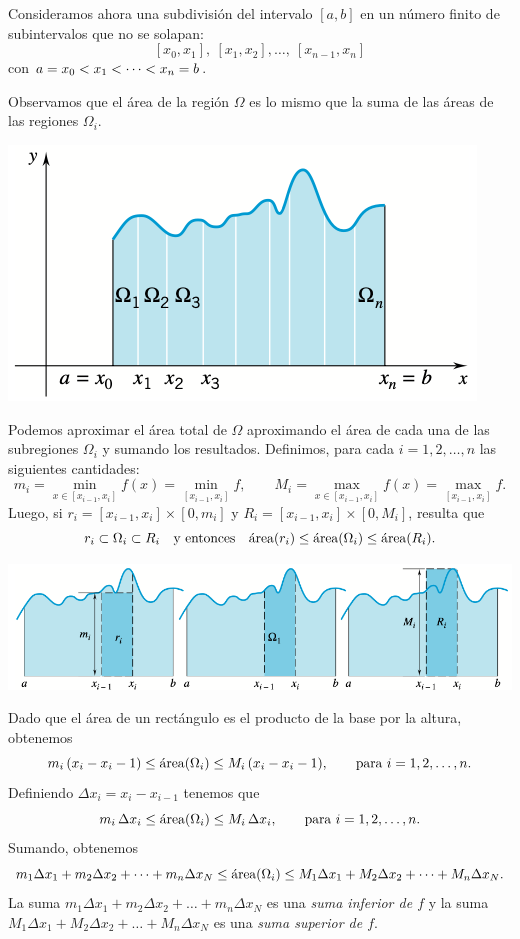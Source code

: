 \noindent
\begin{minipage}{.5\textwidth}
  Consideramos ahora una subdivisión del intervalo $[a,b]$ en un número finito de subintervalos que no se solapan:
  \[
  [x_0,x_1],\ [x_1,x_2],\dots,\ [x_{n-1},x_n]
  \]
  con $\displaystyle a=x_0<x_1<\dots<x_n=b$.

  Observamos que el área de la región $\Omega$ es lo mismo que la suma de las áreas de las regiones $\Omega_i$.
\end{minipage}
\begin{minipage}{.5\textwidth}
  \centering
  \includegraphics[width=.9\textwidth]{pics/area-bajo-curva-particionada.png}
\end{minipage}

Podemos aproximar el área total de $\Omega$ aproximando el área de cada una de las subregiones $\Omega_i$ y sumando los resultados.
Definimos, para cada $i=1,2,\dots,n$ las siguientes cantidades:
\[ 
  m_i = \min_{x\in [x_{i-1},x_i]}f(x)=\min_{[x_{i-1},x_i]}f,
  \qquad
  M_i = \max_{x\in [x_{i-1},x_i]}f(x)=\max_{[x_{i-1},x_i]}f.
\]
Luego, si $r_i = [x_{i-1},x_i]\times [0,m_i]$ y $R_i = [x_{i-1},x_i]\times [0,M_i]$, resulta que
\[
r_i \subset \Omega_i \subset R_i
\quad\text{y entonces}\quad
\mathrm{\protect\acute{a}rea}(r_i)\le \mathrm{\protect\acute{a}rea}(\Omega_i) \le \mathrm{\protect\acute{a}rea}(R_i).
\]

\centerline{
  \includegraphics[width=.9\textwidth]{pics/area-omega-i.png}
}

Dado que el área de un rectángulo es el producto de la base por la altura, obtenemos
\[
m_i\, (x_i-x_i-1)
\le \mathrm{\protect\acute{a}rea}(\Omega_i) \le
M_i\, (x_i-x_i-1),
\qquad\text{para $i=1,2,\dots,n$}.
\]
Definiendo $\Delta x_i=x_i-x_{i-1}$ tenemos que 
\[
m_i\, \Delta x_i
\le \mathrm{\protect\acute{a}rea}(\Omega_i) \le
M_i\, \Delta x_i,
\qquad\text{para $i=1,2,\dots,n$}.
\]
Sumando, obtenemos
\begin{equation}
  \label{eq:L<I<U}
m_1 \Delta x_1 + m_2 \Delta x_2 + \dots + m_n \Delta x_N
\le \mathrm{\protect\acute{a}rea}(\Omega_i) \le
M_1 \Delta x_1 + M_2 \Delta x_2 + \dots + M_n \Delta x_N.
\end{equation}
La suma $m_1 \Delta x_1 + m_2 \Delta x_2 + \dots + m_n \Delta x_N$ es una \emph{suma inferior de $f$} 
y la suma $M_1 \Delta x_1 + M_2 \Delta x_2 + \dots + M_n \Delta x_N$ es una \emph{suma superior de $f$}.

